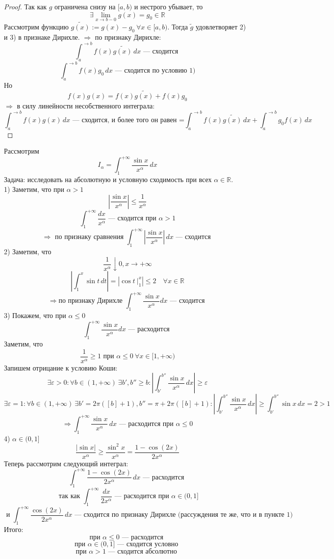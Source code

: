 \documentclass[11pt]{article}
\begin{document}
\begin{proof}
    Так как $g$ ограничена снизу на $[a,b)$ и нестрого убывает, то 
    \[ \exists \lim\limits_{x\to b-0} g(x) = g_0 \in \mathbb{R} \]
    Рассмотрим функцию $\widetilde{g(x)} := g(x) - g_0 \ \forall x\in [a,b) $. Тогда $\widetilde{g}$ удовлетворяет 2) и 3) в признаке Дирихле.
    $\Rightarrow$ по признаку Дирихле:
    \[ \int_{a}^{\to b} f(x)\widetilde{g(x)}\, dx \text{ --- сходится } \]
    \[ \int_{a}^{\to b} f(x)g_0\, dx \text{ --- сходится по условию 1)} \]
    Но 
    \[ f(x)g(x) = f(x)\widetilde{g(x)} + f(x)g_0 \]
    $\Rightarrow$ в силу линейности несобственного интеграла:
    \[ \int_{a}^{\to b} f(x)g(x)\, dx \text{ --- сходится, и более того он равен =} \int_{a}^{\to b} f(x)\widetilde{g(x)}\, dx + \int_{a}^{\to b} g_0f(x)\, dx \]
\end{proof}


\begin{example}
    Рассмотрим
    \[ I_\alpha = \int_{1}^{+\infty} \frac{\sin x}{x^\alpha}\,dx \]
    Задача: исследовать на абсолютную и условную сходимость при всех $\alpha\in \mathbb{R}$.\\
    1) Заметим, что при $\alpha>1$ 
    \[ \left| \frac{\sin x}{x^\alpha} \right| \le \frac{1}{x^\alpha } \] 
    \[ \int_{1}^{+\infty} \frac{dx}{x^\alpha} \text{ --- сходится при } \alpha>1 \]
    \[ \Rightarrow \text{ по признаку сравнения } \int_{1}^{+\infty} \left| \frac{\sin x}{x^\alpha} \right| \,dx \text{ --- сходится } \]
    2) Заметим, что 
    \[ \frac{1}{x^\alpha} \downarrow 0, x\to +\infty \]
    \[ \left| \int_{1}^{x} \sin t\, dt \right| = \left|\cos t \ \bigg|_1^{x}\right| \le 2 \quad \forall x\in \mathbb{R} \]
    \[ \Rightarrow \text{по признаку Дирихле } \int_{1}^{+\infty } \frac{\sin x}{x^\alpha} dx \text{ --- сходится } \]
    3) Покажем, что при $\alpha \le 0$ 
    \[ \int_{1}^{+\infty } \frac{\sin x}{x^\alpha} dx \text{ --- расходится } \]
    Заметим, что 
    \[ \frac{1}{x^\alpha } \ge 1 \text{ при } \alpha\le 0 \ \forall x\in [1,+\infty) \]
    Запишем отрицание к условию Коши:
    \[ \exists \varepsilon>0: \forall b \in (1,+\infty) \ \exists b',b'' \ge b: \left| \int_{b'}^{b''} \frac{\sin x}{x^\alpha}\, dx \right| \ge \varepsilon  \]
    \[ \exists \varepsilon=1: \forall b \in (1,+\infty) \ \exists b'= 2\pi ([b]+1) ,b'' = \pi+2\pi ([b]+1) : \left| \int_{b'}^{b''} \frac{\sin x}{x^\alpha}\, dx \right| \ge \int_{b'}^{b''} \sin x\,dx = 2 >1 \] 
    \[ \Rightarrow \int_{1}^{+\infty} \frac{\sin x}{x^\alpha} \, dx \text{ --- расходится при } \alpha \le 0 \]
    4) $\alpha\in (0,1] $
    \[ \frac{|\sin x|}{x^\alpha } \ge \frac{\sin^2 x}{x^\alpha} = \frac{1-\cos (2x)}{2x^\alpha} \]
    Теперь рассмотрим следующий интеграл:
    \[ \int_{1}^{+\infty} \frac{1-\cos (2x)}{2x^\alpha} \, dx \text{ --- расходится } \] 
    \[ \text{ так как } \int_{1}^{+\infty } \frac{dx}{2x^\alpha} \text{ --- расходится при } \alpha \in (0,1] \]
    \[ \text{ и } \int_{1}^{+\infty} \frac{\cos (2x)}{2x^\alpha}\, dx \text{ --- сходится по признаку Дирихле (рассуждения те же, что и в пункте 1)}  \]
    Итого: 
    \[ \text{при } \alpha \le 0 \text{ --- расходится } \]
    \[ \text{при } \alpha \in (0,1] \text{ --- сходится условно } \]
    \[ \text{при } \alpha > 1 \text{ --- сходится абсолютно } \]
\end{example}
\end{document}
